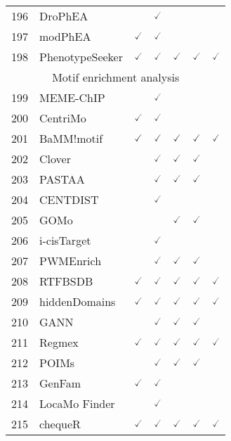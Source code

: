 \documentclass[10pt,letterpaper]{article}
\begin{document}
\begin{table}[!ht]
\begin{adjustwidth}{-2.25in}{0in}
\begin{tabular}{|c|l|c|c|c|c|c|}
196 & DroPhEA\cite{weng2011dro} & & $\checked$ & & & \\ 
197 & modPhEA\cite{weng2017mod} & $\checked$ & $\checked$ & & & \\
198 & PhenotypeSeeker\cite{aun2018k} & $\checked$ & $\checked$ & $\checked$ & $\checked$ & $\checked$  \\ \hline
\hline
\multicolumn{7}{|c|}{Motif enrichment analysis} \\ \hline
\hline
199 & MEME-ChIP\cite{machanick2011meme} & & $\checked$ & & & \\ 
200 & CentriMo\cite{lesluyes2014differential} & $\checked$ & $\checked$ & & & \\ 
201 & BaMM!motif\cite{siebert2016bayesian} & $\checked$ & $\checked$ & $\checked$ & $\checked$ & $\checked$ \\ 
202 & Clover\cite{frith2004detection} & & $\checked$ & $\checked$ & $\checked$ & \\ 
203 & PASTAA\cite{roider2008pastaa} & & $\checked$ & $\checked$ & $\checked$ & \\ 
204 & CENTDIST\cite{zhang2011centdist} & & $\checked$ & & & \\ 
205 & GOMo\cite{buske2010assigning} & & & $\checked$ & $\checked$ & \\ 
206 & i-cisTarget\cite{herrmann2012cistarget} & & $\checked$ & & & \\ 
207 & PWMEnrich\cite{stojnic2013overview} & & $\checked$ & $\checked$ & $\checked$ & \\ 
208 & RTFBSDB\cite{wang2016rtfbsdb} & $\checked$ & $\checked$ & $\checked$ & $\checked$ & $\checked$  \\
209 & hiddenDomains\cite{starmer2016detecting} & $\checked$ & $\checked$ & $\checked$ & $\checked$ & $\checked$  \\
210 & GANN\cite{beiko2005gann} & & $\checked$ & $\checked$ & $\checked$ & \\ 
211 & Regmex\cite{nielsen2018regmex} & $\checked$ & $\checked$ & $\checked$ & $\checked$ & $\checked$  \\
212 & POIMs\cite{sonnenburg2008poims} & & $\checked$ & $\checked$ & $\checked$ & \\ 
213 & GenFam\cite{bedre2018genfam} & $\checked$ & $\checked$ & & & \\ 
214 & LocaMo Finder\cite{vandenbon2013parzen} & & $\checked$ & & & \\ 
215 & chequeR\cite{centeno2016genome} & $\checked$ & $\checked$ & $\checked$ & $\checked$ & $\checked$  \\

\end{tabular}
\end{adjustwidth}
\end{table}
\end{document}
